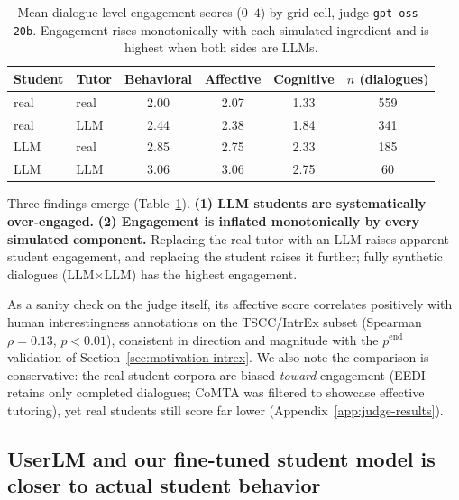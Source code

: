 \documentclass[11pt]{article}
\begin{document}
\begin{table}[h]
\centering
\small
\begin{tabular}{llcccc}
\toprule
Student & Tutor & Behavioral & Affective & Cognitive & $n$ (dialogues) \\
\midrule
real & real & 2.00 & 2.07 & 1.33 & 559 \\
real & LLM  & 2.44 & 2.38 & 1.84 & 341 \\
LLM  & real & 2.85 & 2.75 & 2.33 & 185 \\
LLM  & LLM  & 3.06 & 3.06 & 2.75 & 60 \\
\bottomrule
\end{tabular}
\caption{Mean dialogue-level engagement scores ($0$--$4$) by grid cell,
judge \texttt{gpt-oss-20b}. Engagement rises monotonically with each
simulated ingredient and is highest when both sides are LLMs.}
\label{tab:judge-grid}
\end{table}

Three findings emerge (Table~\ref{tab:judge-grid}). \textbf{(1) LLM students are systematically over-engaged.}  \textbf{(2) Engagement is inflated
monotonically by every simulated component.} Replacing the real tutor with an LLM raises apparent student engagement, and replacing the student raises it further; fully synthetic dialogues (LLM$\times$LLM) has the highest engagement. 

As a sanity check on the judge itself, its affective score correlates positively with human interestingness annotations on the TSCC/IntrEx subset (Spearman $\rho=0.13$, $p<0.01$), consistent in direction and magnitude with the $p^{\text{end}}$ validation of Section~\ref{sec:motivation-intrex}. 
We also note the comparison is conservative: the real-student corpora are biased \emph{toward} engagement (EEDI retains only completed dialogues; CoMTA was filtered to showcase effective tutoring), yet real students still score far lower (Appendix~\ref{app:judge-results}).



\subsection{UserLM and our fine-tuned student model is closer to actual student behavior}
\label{sec:similarity}
\end{document}
